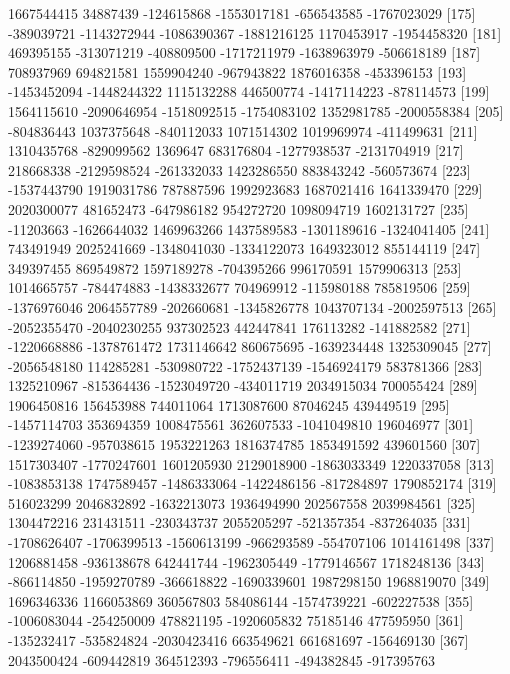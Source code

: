 \documentclass[11pt]{article}
\begin{document}
{\begin{Schunk}
\begin{Soutput}
[169]  1667544415    34887439  -124615868 -1553017181  -656543585 -1767023029
[175]  -389039721 -1143272944 -1086390367 -1881216125  1170453917 -1954458320
[181]   469395155  -313071219  -408809500 -1717211979 -1638963979  -506618189
[187]   708937969   694821581  1559904240  -967943822  1876016358  -453396153
[193] -1453452094 -1448244322  1115132288   446500774 -1417114223  -878114573
[199]  1564115610 -2090646954 -1518092515 -1754083102  1352981785 -2000558384
[205]  -804836443  1037375648  -840112033  1071514302  1019969974  -411499631
[211]  1310435768  -829099562     1369647   683176804 -1277938537 -2131704919
[217]   218668338 -2129598524  -261332033  1423286550   883843242  -560573674
[223] -1537443790  1919031786   787887596  1992923683  1687021416  1641339470
[229]  2020300077   481652473  -647986182   954272720  1098094719  1602131727
[235]   -11203663 -1626644032  1469963266  1437589583 -1301189616 -1324041405
[241]   743491949  2025241669 -1348041030 -1334122073  1649323012   855144119
[247]   349397455   869549872  1597189278  -704395266   996170591  1579906313
[253]  1014665757  -784474883 -1438332677   704969912  -115980188   785819506
[259] -1376976046  2064557789  -202660681 -1345826778  1043707134 -2002597513
[265] -2052355470 -2040230255   937302523   442447841   176113282  -141882582
[271] -1220668886 -1378761472  1731146642   860675695 -1639234448  1325309045
[277] -2056548180   114285281  -530980722 -1752437139 -1546924179   583781366
[283]  1325210967  -815364436 -1523049720  -434011719  2034915034   700055424
[289]  1906450816   156453988   744011064  1713087600    87046245   439449519
[295] -1457114703   353694359  1008475561   362607533 -1041049810   196046977
[301] -1239274060  -957038615  1953221263  1816374785  1853491592   439601560
[307]  1517303407 -1770247601  1601205930  2129018900 -1863033349  1220337058
[313] -1083853138  1747589457 -1486333064 -1422486156  -817284897  1790852174
[319]   516023299  2046832892 -1632213073  1936494990   202567558  2039984561
[325]  1304472216   231431511  -230343737  2055205297  -521357354  -837264035
[331] -1708626407 -1706399513 -1560613199  -966293589  -554707106  1014161498
[337]  1206881458  -936138678   642441744 -1962305449 -1779146567  1718248136
[343]  -866114850 -1959270789  -366618822 -1690339601  1987298150  1968819070
[349]  1696346336  1166053869   360567803   584086144 -1574739221  -602227538
[355] -1006083044  -254250009   478821195 -1920605832    75185146   477595950
[361]  -135232417  -535824824 -2030423416   663549621   661681697  -156469130
[367]  2043500424  -609442819   364512393  -796556411  -494382845  -917395763

\end{Soutput}
\end{Schunk}}
\end{document}
